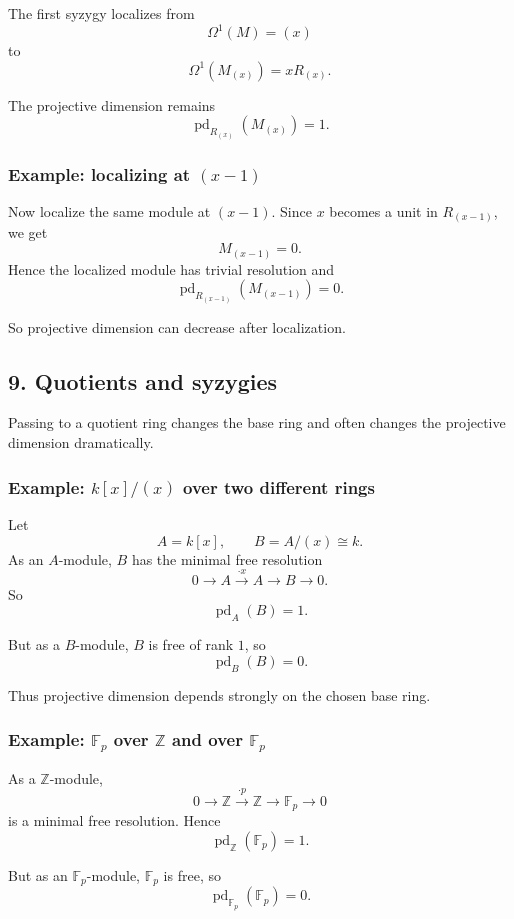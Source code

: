 \documentclass[12pt,a4paper]{article}
\theoremstyle{notespace}
\theoremstyle{definition}
\begin{document}
The first syzygy localizes from
\[
\Omega^1(M)=(x)
\]
to
\[
\Omega^1(M_{(x)})=xR_{(x)}.
\]

The projective dimension remains
\[
\operatorname{pd}_{R_{(x)}}(M_{(x)})=1.
\]

\subsubsection*{Example: localizing at \((x-1)\)}

Now localize the same module at \((x-1)\).
Since \(x\) becomes a unit in \(R_{(x-1)}\), we get
\[
M_{(x-1)}=0.
\]
Hence the localized module has trivial resolution and
\[
\operatorname{pd}_{R_{(x-1)}}(M_{(x-1)})=0.
\]

So projective dimension can decrease after localization.

\subsection{9. Quotients and syzygies}

Passing to a quotient ring changes the base ring and often changes the projective dimension dramatically.

\subsubsection*{Example: \(k[x]/(x)\) over two different rings}

Let
\[
A=k[x], \qquad B=A/(x)\cong k.
\]
As an \(A\)-module, \(B\) has the minimal free resolution
\[
0 \longrightarrow A \xrightarrow{\cdot x} A \longrightarrow B \longrightarrow 0.
\]
So
\[
\operatorname{pd}_A(B)=1.
\]

But as a \(B\)-module, \(B\) is free of rank \(1\), so
\[
\operatorname{pd}_B(B)=0.
\]

Thus projective dimension depends strongly on the chosen base ring.

\subsubsection*{Example: \(\mathbb F_p\) over \(\mathbb Z\) and over \(\mathbb F_p\)}

As a \(\mathbb Z\)-module,
\[
0 \longrightarrow \mathbb Z \xrightarrow{\cdot p} \mathbb Z \longrightarrow \mathbb F_p \longrightarrow 0
\]
is a minimal free resolution.
Hence
\[
\operatorname{pd}_{\mathbb Z}(\mathbb F_p)=1.
\]

But as an \(\mathbb F_p\)-module, \(\mathbb F_p\) is free, so
\[
\operatorname{pd}_{\mathbb F_p}(\mathbb F_p)=0.
\]
\end{document}
